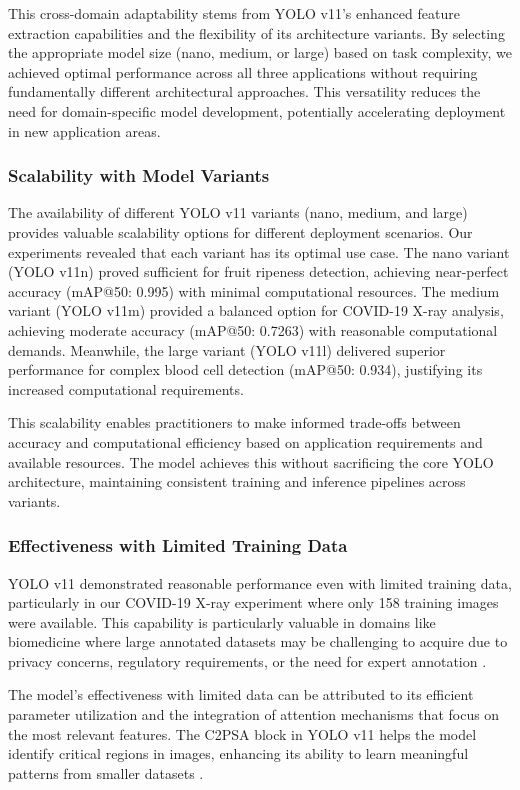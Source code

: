 \begin{multicols}{2}
This cross-domain adaptability stems from YOLO v11's enhanced feature extraction capabilities and the flexibility of its architecture variants. By selecting the appropriate model size (nano, medium, or large) based on task complexity, we achieved optimal performance across all three applications without requiring fundamentally different architectural approaches. This versatility reduces the need for domain-specific model development, potentially accelerating deployment in new application areas.

\subsubsection{Scalability with Model Variants}
The availability of different YOLO v11 variants (nano, medium, and large) provides valuable scalability options for different deployment scenarios. Our experiments revealed that each variant has its optimal use case. The nano variant (YOLO v11n) proved sufficient for fruit ripeness detection, achieving near-perfect accuracy (mAP@50: 0.995) with minimal computational resources. The medium variant (YOLO v11m) provided a balanced option for COVID-19 X-ray analysis, achieving moderate accuracy (mAP@50: 0.7263) with reasonable computational demands. Meanwhile, the large variant (YOLO v11l) delivered superior performance for complex blood cell detection (mAP@50: 0.934), justifying its increased computational requirements.

This scalability enables practitioners to make informed trade-offs between accuracy and computational efficiency based on application requirements and available resources. The model achieves this without sacrificing the core YOLO architecture, maintaining consistent training and inference pipelines across variants.

\subsubsection{Effectiveness with Limited Training Data}
YOLO v11 demonstrated reasonable performance even with limited training data, particularly in our COVID-19 X-ray experiment where only 158 training images were available. This capability is particularly valuable in domains like biomedicine where large annotated datasets may be challenging to acquire due to privacy concerns, regulatory requirements, or the need for expert annotation \citep{Chan2020}.

The model's effectiveness with limited data can be attributed to its efficient parameter utilization and the integration of attention mechanisms that focus on the most relevant features. The C2PSA block in YOLO v11 helps the model identify critical regions in images, enhancing its ability to learn meaningful patterns from smaller datasets \citep{Rao2024}.


\end{multicols}
